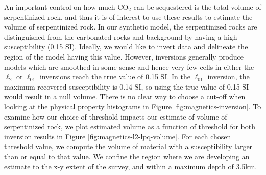 \documentclass[
    paper,
  ]{geophysics}
\begin{document}


An important control on how much CO$_2$ can be sequestered is the total volume of serpentinized rock, and thus it is of interest to use these results to estimate the volume of serpentinized rock. In our synthetic model, the serpentinized rocks are distinguished from the carbonated rocks and background by having a high susceptibility (0.15 SI). Ideally, we would like to invert data and delineate the region of the model having this value. However, inversions generally produce models which are smoothed in some sense and hence very few cells in either the $\ell_2$ or $\ell_{01}$ inversions reach the true value of 0.15 SI. In the $\ell_{01}$ inversion, the maximum recovered susceptibility is 0.14 SI, so using the true value of 0.15 SI would result in a null volume. There is no clear way to choose a cut-off when looking at the physical property histograms in Figure \ref{fig:magnetics-inversion}. To examine how our choice of threshold impacts our estimate of volume of serpentinized rock, we plot estimated volume as a function of threshold for both inversion results in Figure \ref{fig:magnetics-l2-lpq-volume}. For each chosen threshold value, we compute the volume of material with a susceptibility larger than or equal to that value. We confine the region where we are developing an estimate to the x-y extent of the survey, and within a maximum depth of 3.5km.


\end{document}
